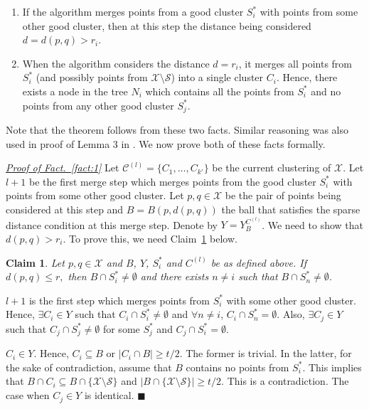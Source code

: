 \documentclass[orivec]{llncs}
\newtheorem{smallLemma}{Claim}
\newcommand{\mc}{\mathcal}
\renewcommand{\qed}{\hfill\ensuremath{\blacksquare}}
\renewcommand\labelitemi{$\bullet$}
\begin{document}
\begin{enumerate}[nolistsep, noitemsep, label=\textbf{F.\arabic*},leftmargin=0.3in]
\renewcommand\labelitemi{$\diamond$}
\item \label{fact:1} If the algorithm merges points from a good cluster $S_i^*$ with points from some other good cluster,  then at this step the distance being considered $d = d(p,q) > r_i$.	
\item \label{fact:2} When the algorithm considers the distance $d = r_i$, it merges all points from $S_i^*$ (and possibly points from $\mc X\setminus \mc S$) into a single cluster $C_i$. Hence, there exists a node in the tree $N_i$ which contains all the points from $S_i^*$ and no points from any other good cluster $S_j^*$. 	
\end{enumerate}
Note that the theorem follows from these two facts. Similar reasoning was also used in proof of Lemma 3 in \cite{balcan2012clustering}. We now prove both of these facts formally. 

\noindent\textit{\underline{Proof of Fact.~\ref{fact:1}}}
Let $\mc C^{(l)} = \{C_1, \ldots, C_{k'}\}$ be the current clustering of $\mc X$. Let $l+1$ be the first merge step which merges points from the good cluster $S_i^*$ with points from some other good cluster. Let $p, q \in \mc X$ be the pair of points being considered at this step and $B = B(p, d(p, q))$ the ball that satisfies the sparse distance condition at this merge step. Denote by $Y = Y_{B}^{C^{(l)}}$. We need to show that $d(p, q) > r_i$. To prove this, we need Claim~\ref{claim:fromBothCluster} below. 

\begin{smallLemma}
\label{claim:fromBothCluster}
Let $p, q \in \mc X$ and $B$, $Y$, $S_i^*$ and $C^{(l)}$ be as defined above. If $d(p, q) \le r,$ then $B \cap S_i^* \neq \emptyset$ and there exists $n \neq i$ such that $B \cap S_n^* \neq \emptyset$.
\end{smallLemma}
\vspace{-0.1in} $l+1$ is the first step which merges points from $S_i^*$ with some other good cluster. Hence, $\exists C_i \in Y$ such that $C_i\cap S_i^*  \neq \emptyset$ and $\forall n \neq i$, $C_i \cap S_n^* = \emptyset$. Also, $\exists C_j \in Y$ such that $C_j \cap S_j^* \neq \emptyset$ for some $S_j^*$ and $C_j \cap S_i^* = \emptyset$.

$C_i \in Y$. Hence, $C_i \subseteq B$ or $|C_i \cap B| \ge t/2$. The former is trivial. In the latter, for the sake of contradiction, assume that $B$ contains no points from $S_i^*$. This implies that $B \cap C_i \subseteq B \cap \{\mc X \setminus \mc S\}$ and $|B\cap \{\mc X \setminus \mc S\}| \ge t/2$. This  is a contradiction. The case when $C_j \in Y$ is identical. \qed
\end{document}
